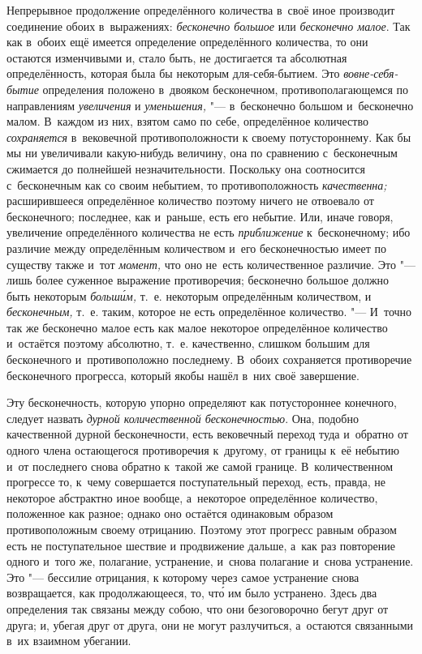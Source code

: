 Непрерывное продолжение определённого количества в~своё иное производит
соединение обоих в~выражениях: {\em бесконечно большое} или {\em бесконечно
малое}. Так как в~обоих ещё имеется определение определённого количества, то
они остаются изменчивыми и, стало быть, не достигается та абсолютная
определённость, которая была бы некоторым для-себя-бытием. Это
{\em вовне-себя-бытие} определения положено в~двояком бесконечном,
противополагающемся по направлениям {\em увеличения} и {\em уменьшения,} "---
в~бесконечно большом и~бесконечно малом. В~каждом из них, взятом само по себе,
определённое количество {\em сохраняется} в~вековечной противоположности к
своему потустороннему. Как бы мы ни увеличивали какую-нибудь величину, она по
сравнению с~бесконечным сжимается до полнейшей незначительности. Поскольку она
соотносится с~бесконечным как со своим небытием, то противоположность
{\em качественна;} расширившееся определённое количество поэтому ничего не
отвоевало от бесконечного; последнее, как и~раньше, есть его небытие. Или,
иначе говоря, увеличение определённого количества не есть {\em приближение}
к~бесконечному; ибо различие между определённым количеством и~его
бесконечностью имеет по существу также и~тот {\em момент,} что оно не~есть
количественное различие. Это "--- лишь более суженное выражение противоречия;
бесконечно большое должно быть некоторым {\em больш\'{и}м,} т.~е. некоторым
определённым количеством, и {\em бесконечным,} т.~е. таким, которое не есть
определённое количество. "--- И~точно так же бесконечно малое есть как малое
некоторое определённое количество и~остаётся поэтому абсолютно, т.~е.
качественно, слишком большим для бесконечного и~противоположно последнему.
В~обоих сохраняется противоречие бесконечного прогресса, который якобы нашёл
в~них своё завершение.

Эту бесконечность, которую упорно определяют как потустороннее конечного,
следует назвать {\em дурной количественной бесконечностью}. Она, подобно
качественной дурной бесконечности, есть вековечный переход туда и~обратно от
одного члена остающегося противоречия к~другому, от границы к~её небытию и~от
последнего снова обратно к~такой же самой границе. В~количественном прогрессе
то, к~чему совершается поступательный переход, есть, правда, не некоторое
абстрактно иное вообще, а~некоторое определённое количество, положенное как
разное; однако оно остаётся одинаковым образом противоположным своему
отрицанию. Поэтому этот прогресс равным образом есть не поступательное шествие
и продвижение дальше, а~как раз повторение одного и~того же, полагание,
устранение, и~снова полагание и~снова устранение. Это "--- бессилие отрицания,
к которому через самое устранение снова возвращается, как продолжающееся, то,
чт\'{о} им было устранено. Здесь два определения так связаны между собою, что они
безоговорочно бегут друг от друга; и, убегая друг от друга, они не могут
разлучиться, а~остаются связанными в~их взаимном убегании.

